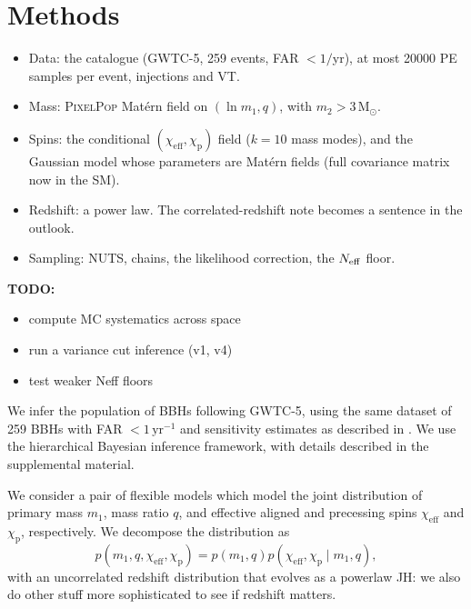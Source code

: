 \documentclass[%
 reprint,
 amsmath,amssymb,
 aps,
 prl,
 nofootinbib,nobibnotes,
]{revtex4-2}
\newcommand{\Msun}{\ensuremath{\mathrm{M}_{\odot}}}
\newcommand{\chieff}{\ensuremath{\chi_{\mathrm{eff}}}}
\newcommand{\chip}{\ensuremath{\chi_{\mathrm{p}}}}
\newcommand{\peryear}{\ensuremath{\,\mathrm{yr}^{-1}}}
\newcommand{\red}[1]{{\color{Red} #1}}
\newcommand{\todo}[1]{{\color{Blue}\bf TODO: #1}}
\newcommand{\jh}[1]{{\color{orange}JH: #1}}
\newcommand{\PixelPop}{\textsc{PixelPop}\xspace}
\begin{document}

\section{Methods}

\red{
\begin{itemize}
\item Data: the catalogue (GWTC-5, 259 events, FAR $< 1/$yr), at most 20000 PE samples per event, injections and VT.
\item Mass: \PixelPop Mat\'ern field on $(\ln m_1, q)$, with $m_2 > 3\,\Msun$.
\item Spins: the conditional $(\chieff, \chip)$ field ($k = 10$ mass modes), and the Gaussian model whose parameters are Mat\'ern fields (full covariance matrix now in the SM).
\item Redshift: a power law. The correlated-redshift note becomes a sentence in the outlook.
\item Sampling: NUTS, chains, the likelihood correction, the $N_{\rm eff}$ floor.
\end{itemize}}

\todo{
\begin{itemize}
    \item compute MC systematics across space
    \item run a variance cut inference (v1, v4)
    \item test weaker Neff floors
\end{itemize}
}

We infer the population of \acp{BBH} following \ac{GWTC-5},  using the same dataset of 259 \acp{BBH} with \ac{FAR} $<1\peryear$ and sensitivity estimates as described in \citet{LIGOScientific:2026ctl}. We use the hierarchical Bayesian inference framework, with details described in the supplemental material.

We consider a pair of flexible models which model the joint distribution of primary mass $m_1$, mass ratio $q$, and effective aligned and precessing spins $\chieff$ and $\chip$, respectively. We decompose the distribution as
\begin{equation}
    p(m_1, q, \chieff, \chip) = p(m_1, q)p(\chieff, \chip \mid m_1, q),
    \label{eq: spins conditional on mass basic model}
\end{equation}
with an uncorrelated redshift distribution that evolves as a powerlaw \jh{we also do other stuff more sophisticated to see if redshift matters}.
\end{document}
